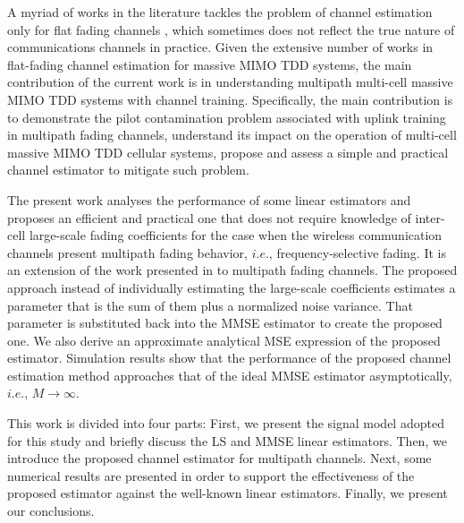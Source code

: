 \documentclass[journal,12pt,onecolumn]{IEEEtran}
\begin{document}
A myriad of works in the literature tackles the problem of channel estimation only for flat fading channels  \cite{marzetta:pilotContamination, marzetta:book, khushboo:semi_blind_est, tadashi:asynch_mu_chann_est, fang:low_rank, mojtaba:traning_for_decorr_chann_est, Debbah:howmanyantennas, Marzetta:finitedimensionalchannels,Ashikhmi:interference_reduction,Bjornson:LowComplexityPolynomial, Gesbert:coordinated, noh:Pilot_beam_pattern, Truong:Channel_Aging, Muller:Blind_Decontamination, Amin:channelEstPilotCont}, which sometimes does not reflect the true nature of communications channels in practice. Given the extensive number of works in flat-fading channel estimation for massive MIMO TDD systems, the main contribution of the current work is in understanding multipath multi-cell massive MIMO TDD systems with channel training. Specifically, the main contribution is to demonstrate the pilot contamination problem associated with uplink training in multipath fading channels, understand its impact on the operation of multi-cell massive MIMO TDD cellular systems, propose and assess a simple and practical channel estimator to mitigate such problem. 

The present work analyses the performance of some linear estimators and proposes an efficient and practical one that does not require knowledge of inter-cell large-scale fading coefficients for the case when the wireless communication channels present multipath fading behavior, $i.e.$, frequency-selective fading. It is an extension of the work presented in \cite{Amin:channelEstPilotCont} to multipath fading channels. The proposed approach instead of individually estimating the large-scale coefficients estimates a parameter that is the sum of them plus a normalized noise variance. That parameter is substituted back into the MMSE estimator to create the proposed one. We also derive an approximate analytical MSE expression of the proposed estimator. Simulation results show that the performance of the proposed channel estimation method approaches that of the ideal MMSE estimator asymptotically, $i.e.$, $M \to \infty$.

This work is divided into four parts: First, we present the signal model adopted for this study and briefly discuss the LS and MMSE linear estimators. Then, we introduce the proposed channel estimator for multipath channels. Next, some numerical results are presented in order to support the effectiveness of the proposed estimator against the well-known linear estimators. Finally, we present our conclusions. 
\end{document}
